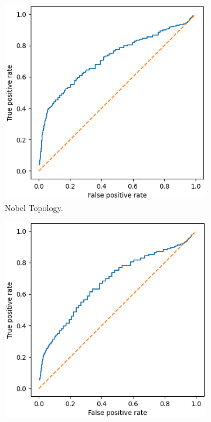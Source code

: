 \noindent
\begin{figure}[H]
    \centering
    \begin{subfigure}{0.475\textwidth}
        \includegraphics[width=\textwidth]{figs/results/nobel-germany_case2_roc.png}
        \caption{Nobel Topology.}
    \end{subfigure}
    \begin{subfigure}{0.475\textwidth}
        \includegraphics[width=\textwidth]{figs/results/france_case2_roc.png}

\end{subfigure}
\end{figure}
